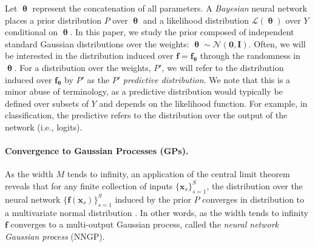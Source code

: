 \documentclass[twoside]{article}
\renewcommand{\ss}[1]{_{\text{#1}}}
\newcommand{\vnull}{\mathbf{0}}
\newcommand{\vf}{\mathbf{f}}
\newcommand{\vx}{\mathbf{x}}
\newcommand{\vtheta}{\bm{\uptheta}}
\newcommand{\mI}{\mathbf{I}}
\newcommand{\R}{\mathbb{R}}
\newcommand{\Normal}{\mathcal{N}}
\renewcommand{\ss}[1]{_{\text{#1}}}        %
\theoremstyle{theoremstyle}
\begin{document}
Let $\vtheta$ represent the concatenation of all parameters. A \textit{Bayesian} neural network places a prior distribution $P$ over $\vtheta$ and a likelihood distribution $\mathcal{L}(\vtheta)$ over $Y$ conditional on $\vtheta$.
In this paper, we study the prior composed of independent standard Gaussian distributions over the weights: $\vtheta \sim \Normal(\vnull, \mI)$. Often, we will be interested in the distribution induced over $\vf = \vf_{\vtheta}$ through the randomness in $\vtheta$. For a distribution over the weights, $P'$, we will refer to the distribution induced over $\vf_{\vtheta}$ by $P'$ as the $P'$ \emph{predictive distribution}. We note that this is a minor abuse of terminology, as a predictive distribution would typically be defined over subsets of $Y$ and depends on the likelihood function. For example, in classification, the predictive refers to the distribution over the output of the network (i.e., logits). 

\paragraph{Convergence to Gaussian Processes (GPs).}
As the width $M$ tends to infinity, an application of the central limit theorem reveals that for any finite collection of inputs $\{\vx_s\}_{s=1}^S$, the distribution over the neural network $\{\vf(\vx_s)\}_{s=1}^S$ induced by the prior $P$ converges in distribution to a multivariate normal distribution \citep{neal_1996, matthews_2018}.
In other words, as the width tends to infinity $\vf$ converges to a multi-output Gaussian process, called the \emph{neural network Gaussian process} (NNGP). %
\end{document}
